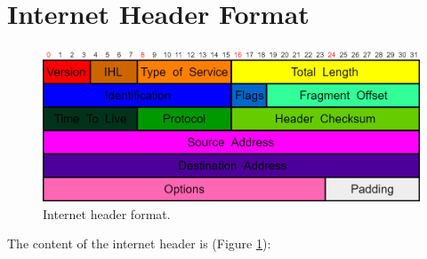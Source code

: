 \section{Internet Header Format}
\begin{figure}[h]
\centering
\includegraphics[scale=0.3]{Images/IP/internet_header}
\caption{\footnotesize{Internet header format.}}\label{internet_header}
\end{figure}
The content of the internet header is (Figure \ref{internet_header}):
